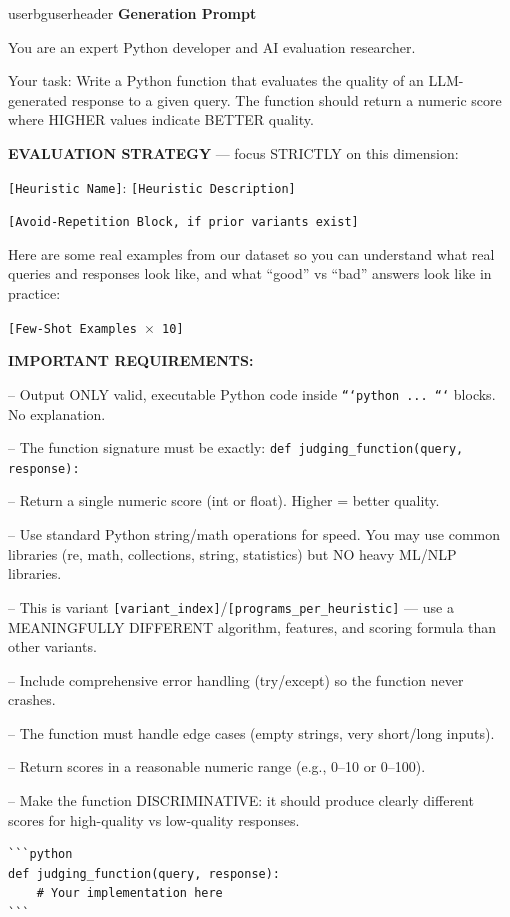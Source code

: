 \documentclass[11pt]{article}
\newcommand{\pgreen}[1]{{\color{promptgreen}\texttt{#1}}}
\begin{document}
\begin{promptbox}{userbg}{userheader}
\textbf{Generation Prompt}

\medskip
You are an expert Python developer and AI evaluation researcher.

Your task: Write a Python function that evaluates the quality of an LLM-generated response to a given query. The function should return a numeric score where HIGHER values indicate BETTER quality.

\textbf{EVALUATION STRATEGY} --- focus STRICTLY on this dimension:

\pgreen{[Heuristic Name]}: \pgreen{[Heuristic Description]}

\pgreen{[Avoid-Repetition Block, if prior variants exist]}

Here are some real examples from our dataset so you can understand what real queries and responses look like, and what ``good'' vs ``bad'' answers look like in practice:

\pgreen{[Few-Shot Examples $\times$ 10]}

\textbf{IMPORTANT REQUIREMENTS:}

-- Output ONLY valid, executable Python code inside \texttt{```python ... ```} blocks. No explanation.

-- The function signature must be exactly: \texttt{def judging\_function(query, response):}

-- Return a single numeric score (int or float). Higher = better quality.

-- Use standard Python string/math operations for speed. You may use common libraries (re, math, collections, string, statistics) but NO heavy ML/NLP libraries.

-- This is variant \pgreen{[variant\_index]}/\pgreen{[programs\_per\_heuristic]} --- use a MEANINGFULLY DIFFERENT algorithm, features, and scoring formula than other variants.

-- Include comprehensive error handling (try/except) so the function never crashes.

-- The function must handle edge cases (empty strings, very short/long inputs).

-- Return scores in a reasonable numeric range (e.g., 0--10 or 0--100).

-- Make the function DISCRIMINATIVE: it should produce clearly different scores for high-quality vs low-quality responses.

\begin{verbatim}
```python
def judging_function(query, response):
    # Your implementation here
```
\end{verbatim}
\end{promptbox}
\end{document}
